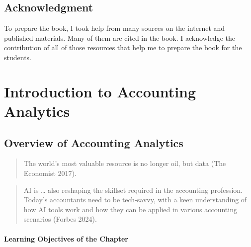 \documentclass[
  letterpaper,
  DIV=11,
  numbers=noendperiod]{scrreprt}
\begin{document}
\chapter*{Acknowledgment}\label{acknowledgment}


To prepare the book, I took help from many sources on the internet and
published materials. Many of them are cited in the book. I acknowledge
the contribution of all of those resources that help me to prepare the
book for the students.

\part{Introduction to Accounting Analytics}

\chapter{Overview of Accounting
Analytics}\label{overview-of-accounting-analytics}

\begin{quote}
The world's most valuable resource is no longer oil, but data (The
Economist 2017).
\end{quote}

\begin{quote}
AI is \ldots{} also reshaping the skillset required in the accounting
profession. Today's accountants need to be tech-savvy, with a keen
understanding of how AI tools work and how they can be applied in
various accounting scenarios (Forbes 2024).
\end{quote}

\subsection*{Learning Objectives of the
Chapter}\label{learning-objectives-of-the-chapter}
\end{document}
